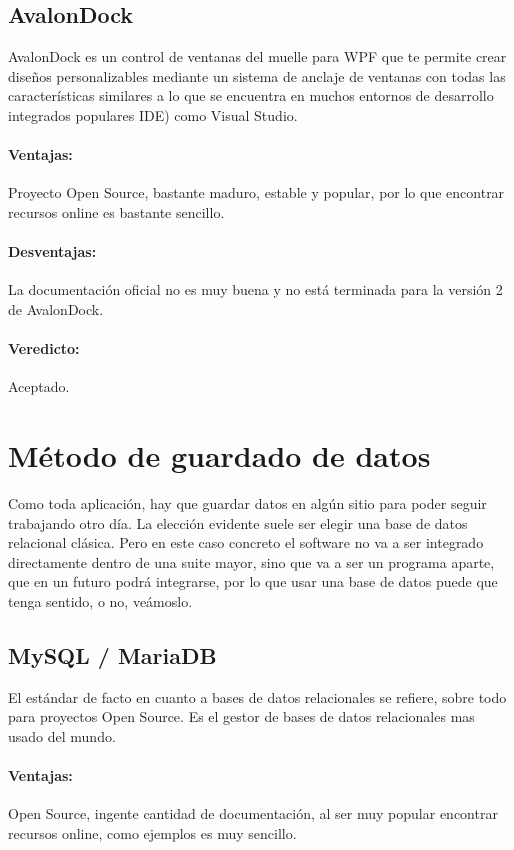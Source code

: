 \subsection{AvalonDock}
AvalonDock es un control de ventanas del muelle para WPF que te permite crear dise\~{n}os personalizables mediante un sistema de anclaje de ventanas con todas
las características similares a lo que se encuentra en muchos entornos de desarrollo integrados populares IDE) como Visual Studio. 

\paragraph{Ventajas:} Proyecto Open Source, bastante maduro, estable y popular, por lo que encontrar recursos online es bastante sencillo.
\paragraph{Desventajas:} La documentaci\'{o}n oficial no es muy buena y no est\'{a} terminada para la versi\'{o}n 2 de AvalonDock.
\paragraph{Veredicto:} Aceptado.

\section{M\'{e}todo de guardado de datos}
Como toda aplicaci\'{o}n, hay que guardar datos en alg\'{u}n sitio para poder seguir trabajando otro d\'{i}a. La elecci\'{o}n evidente
suele ser elegir una base de datos relacional cl\'{a}sica. Pero en este caso concreto el software no va a ser integrado directamente dentro de una
suite mayor, sino que va a ser un programa aparte, que en un futuro podr\'{a} integrarse, por lo que usar una base de datos puede que tenga sentido,
o no, ve\'{a}moslo.
\subsection{MySQL / MariaDB}
El est\'{a}ndar de facto en cuanto a bases de datos relacionales se refiere, sobre todo para proyectos Open Source. Es el gestor de bases de 
datos relacionales mas usado del mundo.

\paragraph{Ventajas:} Open Source, ingente cantidad de documentaci\'{o}n, al ser muy popular encontrar recursos online, como ejemplos
es muy sencillo.

